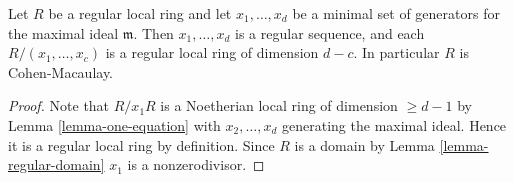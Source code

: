 \begin{lemma}
\label{lemma-regular-ring-CM}
Let $R$ be a regular local ring and let
$x_1, \ldots, x_d$ be a minimal set of generators
for the maximal ideal $\mathfrak m$. Then
$x_1, \ldots, x_d$ is a regular sequence, and
each $R/(x_1, \ldots, x_c)$ is a regular local ring
of dimension $d - c$. In particular $R$ is Cohen-Macaulay.
\end{lemma}

\begin{proof}
Note that $R/x_1R$ is a Noetherian local ring of dimension $\geq d - 1$
by Lemma \ref{lemma-one-equation} with $x_2, \ldots, x_d$
generating the maximal ideal. Hence it is a regular local ring by definition.
Since $R$ is a domain by Lemma \ref{lemma-regular-domain}
$x_1$ is a nonzerodivisor.
\end{proof}
